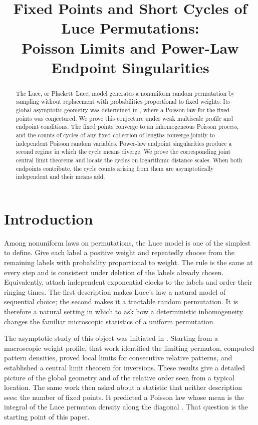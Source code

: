 \documentclass[11pt]{article}
\title{Fixed Points and Short Cycles of Luce Permutations:\\
Poisson Limits and Power-Law Endpoint Singularities}
\author{}
\date{}
\theoremstyle{remark}
\theoremstyle{plain}
\begin{document}
\maketitle

\begin{abstract}
The Luce, or Plackett--Luce, model generates a nonuniform random permutation
by sampling without replacement with probabilities proportional to fixed
weights.  Its global asymptotic geometry was determined in
\cite{borga2025permutonlocallimitsluce}, where a Poisson law for the fixed
points was conjectured.  We prove this conjecture under weak multiscale
profile and endpoint conditions.  The fixed points converge to an inhomogeneous Poisson
process, and the counts of cycles of any fixed collection of lengths converge
jointly to independent Poisson random variables.  Power-law endpoint
singularities produce a second regime in which the cycle means diverge.  We
prove the corresponding joint central limit theorems and locate the cycles on
logarithmic distance scales.  When both endpoints contribute, the cycle
counts arising from them are asymptotically independent and their means add.
\end{abstract}

\tableofcontents
\clearpage

\section{Introduction}

Among nonuniform laws on permutations, the Luce model is one of the simplest
to define.  Give each label a positive weight and repeatedly choose from the
remaining labels with probability proportional to weight.  The rule is the
same at every step and is consistent under deletion of the labels already
chosen.  Equivalently, attach independent exponential clocks to the labels
and order their ringing times.  The first description makes Luce's law a
natural model of sequential choice; the second makes it a tractable random
permutation.  It is therefore a natural setting in which to ask how a
deterministic inhomogeneity changes the familiar microscopic statistics of a
uniform permutation.

The asymptotic study of this object was initiated in
\cite{borga2025permutonlocallimitsluce}.  Starting from a macroscopic weight
profile, that work identified the limiting permuton, computed pattern
densities, proved local limits for consecutive relative patterns, and
established a central limit theorem for inversions.  These results give a
detailed picture of the global geometry and of the relative order seen from a
typical location.  The same work then asked about a statistic that neither
description sees: the number of fixed points.  It predicted a Poisson law
whose mean is the integral of the Luce permuton density along the diagonal
\cite[Section~5.2]{borga2025permutonlocallimitsluce}.  That question is the
starting point of this paper.
\end{document}
